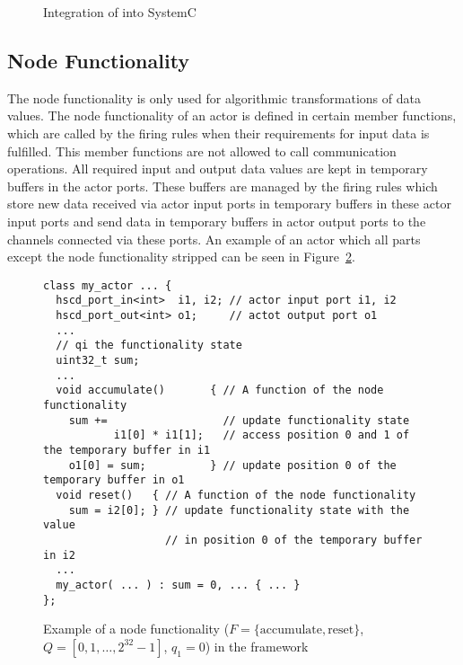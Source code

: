 \begin{figure}[h]
\centering

\caption{Integration of \SysteMoC{} into SystemC}
\label{fig:SysteMoC-Goals}
\end{figure}

\subsection{Node Functionality}
The node functionality is only used for algorithmic transformations of data values.
The node functionality of an actor is defined in certain member functions,
which are called by the firing rules when their requirements for input data
is fulfilled. This member functions are not allowed to call communication
operations. All required input and output data values are kept in temporary buffers
in the actor ports. These buffers are managed by the firing rules which store
new data received via actor input ports in temporary buffers in these
actor input ports and send data in temporary buffers in actor output ports
to the channels connected via these ports. An example of an actor which all parts
except the node functionality stripped can be seen in Figure~\ref{example-node-functionality}.


\begin{figure}[h]
\centering
\begin{verbatim}
class my_actor ... {
  hscd_port_in<int>  i1, i2; // actor input port i1, i2
  hscd_port_out<int> o1;     // actot output port o1
  ...
  // qi the functionality state
  uint32_t sum;
  ...
  void accumulate()       { // A function of the node functionality
    sum +=                  // update functionality state
           i1[0] * i1[1];   // access position 0 and 1 of the temporary buffer in i1
    o1[0] = sum;          } // update position 0 of the temporary buffer in o1
  void reset()   { // A function of the node functionality
    sum = i2[0]; } // update functionality state with the value
                   // in position 0 of the temporary buffer in i2
  ...
  my_actor( ... ) : sum = 0, ... { ... }
};
\end{verbatim}
\caption{Example of a node functionality
($F = \{\textrm{accumulate}, \textrm{reset}\}$, $Q= [0,1,\ldots,2^{32}-1]$, $q_1 = 0$)
in the \SysteMoC{} framework}\label{example-node-functionality}
\end{figure}

